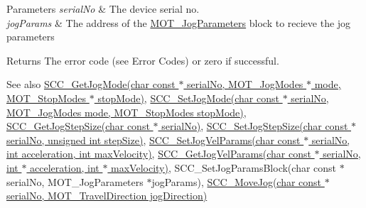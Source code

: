 \begin{DoxyParams}{Parameters}
{\em serial\+No} & The device serial no. \\
\hline
{\em jog\+Params} & The address of the \hyperlink{struct_m_o_t___jog_parameters}{M\+O\+T\+\_\+\+Jog\+Parameters} block to recieve the jog parameters \\
\hline
\end{DoxyParams}
\begin{DoxyReturn}{Returns}
The error code (see Error Codes) or zero if successful. 
\end{DoxyReturn}
\begin{DoxySeeAlso}{See also}
\hyperlink{group___k_cube_stepper_ga175e078da8fb47396ce927ed6bf8fbd9}{S\+C\+C\+\_\+\+Get\+Jog\+Mode(char const $\ast$ serial\+No, M\+O\+T\+\_\+\+Jog\+Modes $\ast$ mode, M\+O\+T\+\_\+\+Stop\+Modes $\ast$ stop\+Mode)}, \hyperlink{group___k_cube_stepper_ga6504337d0dfd4ae9076f493b0f209ee5}{S\+C\+C\+\_\+\+Set\+Jog\+Mode(char const $\ast$ serial\+No, M\+O\+T\+\_\+\+Jog\+Modes mode, M\+O\+T\+\_\+\+Stop\+Modes stop\+Mode)}, \hyperlink{group___k_cube_stepper_gaa628ab92b321b2fc84b83e234c10eda9}{S\+C\+C\+\_\+\+Get\+Jog\+Step\+Size(char const $\ast$ serial\+No)}, \hyperlink{group___k_cube_stepper_gafb9a2b1e88b11dc485de37787ed9866c}{S\+C\+C\+\_\+\+Set\+Jog\+Step\+Size(char const $\ast$ serial\+No, unsigned int step\+Size)}, \hyperlink{group___k_cube_stepper_ga060d0d1d5f56464d3ee486117034aaf4}{S\+C\+C\+\_\+\+Set\+Jog\+Vel\+Params(char const $\ast$ serial\+No, int acceleration, int max\+Velocity)}, \hyperlink{group___k_cube_stepper_gad17e113a6d0742937c7ef2955cf1aecc}{S\+C\+C\+\_\+\+Get\+Jog\+Vel\+Params(char const $\ast$ serial\+No, int $\ast$ acceleration, int $\ast$ max\+Velocity)}, S\+C\+C\+\_\+\+Set\+Jog\+Params\+Block(char const $\ast$ serial\+No, M\+O\+T\+\_\+\+Jog\+Parameters $\ast$jog\+Params), \hyperlink{group___k_cube_stepper_ga183454cf1f83e6feff1a74ef1870a7a7}{S\+C\+C\+\_\+\+Move\+Jog(char const $\ast$ serial\+No, M\+O\+T\+\_\+\+Travel\+Direction jog\+Direction)}


\end{DoxySeeAlso}

\begin{DoxyCodeInclude}
\end{DoxyCodeInclude}
